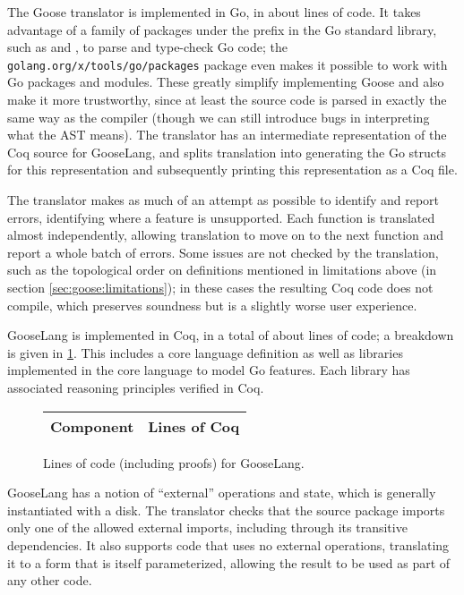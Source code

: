 
The Goose translator is implemented in Go, in about  lines of code.
It takes advantage of a family of packages under
the  prefix in the Go standard library, such as  and , to
parse and type-check Go code; the \texttt{golang.org/x/tools/go/packages} package
even makes it possible to work with Go packages and modules. These greatly
simplify implementing Goose and also make it more trustworthy, since at least
the source code is parsed in exactly the same way as the compiler (though we can
still introduce bugs in interpreting what the AST means).
The translator has an intermediate representation of the Coq source for
GooseLang, and splits translation into generating the Go structs for this
representation and subsequently printing this representation as a Coq file.

The translator makes as much of an attempt as possible to identify and report
errors, identifying where a feature is unsupported. Each function is translated
almost independently, allowing translation to move on to the next function and
report a whole batch of errors. Some issues are not checked by the translation,
such as the topological order on definitions mentioned in limitations above (in
section \cref{sec:goose:limitations}); in these cases the resulting Coq code
does not compile, which preserves soundness but is a slightly worse user
experience.

GooseLang is implemented in Coq, in a total of about  lines of code;
a breakdown is given in \cref{fig:gooselang:lines}.
This includes a core language definition as well as libraries implemented in the
core language to model Go features. Each library has associated reasoning
principles verified in Coq.

\begin{figure}
\centering
\begin{tabular}{lr}
\toprule
\bf Component & \bf Lines of Coq \\
\midrule
  
\end{tabular}
\caption[Lines of code for GooseLang]%
{Lines of code (including proofs) for GooseLang.}
\label{fig:gooselang:lines}
\end{figure}


GooseLang has a notion of ``external'' operations and state, which is generally
instantiated with a disk. The translator checks that the source package imports
only one of the allowed external imports, including through its transitive
dependencies. It also supports code that uses no external operations,
translating it to a form that is itself parameterized, allowing the result to be
used as part of any other code.

